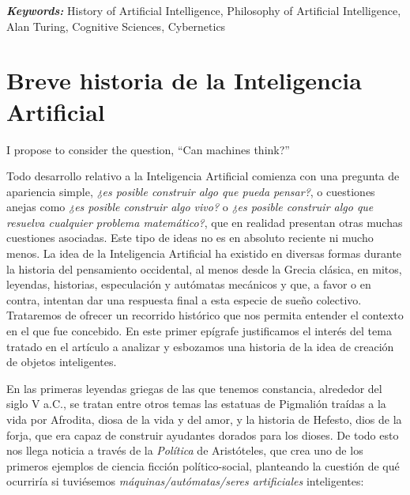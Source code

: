 \documentclass[12pt]{memoir}
\providecommand{\keywords}[2]{
	\textbf{\textit{#1: }} #2
}
\begin{document}
\keywords{Keywords}{History of Artificial Intelligence, Philosophy of Artificial Intelligence, Alan Turing, Cognitive Sciences, Cybernetics}

\newpage
\thispagestyle{empty}




\DoubleSpacing
\begin{KeepFromToc}
  \tableofcontents
\end{KeepFromToc}
\thispagestyle{empty}
\OnehalfSpacing
\newpage

\pagestyle{fancy}
\fancyhf{}
\cfoot{\thepage}

\chapter{Breve historia de la Inteligencia Artificial}

\epigraph{\flqq I propose to consider the question, ``Can machines think?''\frqq}{\cite{Turing1950cmi}}

Todo desarrollo relativo a la Inteligencia Artificial comienza con una pregunta de apariencia simple, \textit{¿es posible construir algo que pueda pensar?}, o cuestiones anejas como  \textit{¿es posible construir algo vivo?} o \textit{¿es posible construir algo que resuelva cualquier problema matemático?}, que en realidad presentan otras muchas cuestiones asociadas. Este tipo de ideas no es en absoluto reciente ni mucho menos. La idea de la Inteligencia Artificial ha existido en diversas formas durante la historia del pensamiento occidental, al menos desde la Grecia clásica, en mitos, leyendas, historias, especulación y autómatas mecánicos y que, a favor o en contra, intentan dar una respuesta final a esta especie de sueño colectivo. Trataremos de ofrecer un recorrido histórico que nos permita entender el contexto en el que \cite{Turing1950cmi} fue concebido. En este primer epígrafe justificamos el interés del tema tratado en el artículo a analizar y esbozamos una historia de la idea de creación de objetos inteligentes.

En las primeras leyendas griegas de las que tenemos constancia, alrededor del siglo V a.C., se tratan entre otros temas las estatuas de Pigmalión traídas a la vida por Afrodita, diosa de la vida y del amor, y la historia de Hefesto, dios de la forja, que era capaz de construir ayudantes dorados para los dioses. De todo esto nos llega noticia a través de la \textit{Política} de Aristóteles, que crea uno de los primeros ejemplos de ciencia ficción político-social, planteando la cuestión de qué ocurriría si tuviésemos \textit{máquinas/autómatas/seres artificiales} inteligentes:
\end{document}
